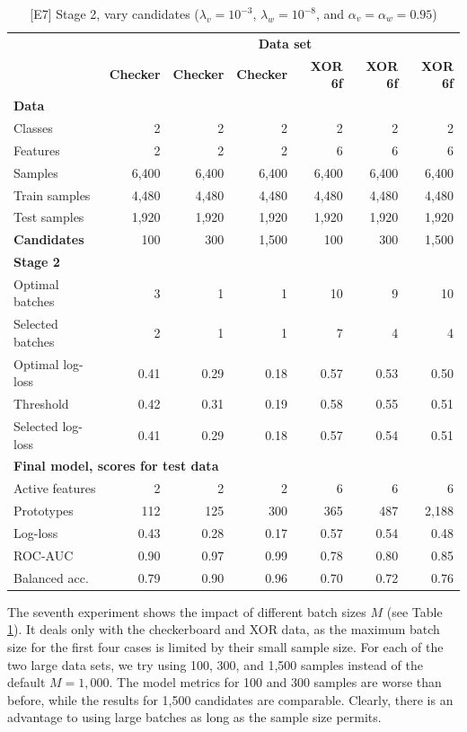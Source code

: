 \begin{table}
\caption{[E7] Stage 2, vary candidates ($\lambda_v=10^{-3}$, $\lambda_w=10^{-8}$, and $\alpha_v=\alpha_w=0.95$)}
\label{tab_e7}
%
\begin{center}
\small
\begin{tabular}{|lrrrrrr|}
\hline
&\multicolumn{6}{c|}{\textbf{\hrulefill\ Data set \hrulefill}}\\
&\textbf{Checker}&\textbf{Checker}&\textbf{Checker}&\textbf{XOR 6f}&\textbf{XOR 6f}&\textbf{XOR 6f}\\
\multicolumn{7}{|l|}{\textbf{Data}}\\
Classes&2&2&2&2&2&2\\
Features&2&2&2&6&6&6\\
Samples&6,400&6,400&6,400&6,400&6,400&6,400\\
Train samples&4,480&4,480&4,480&4,480&4,480&4,480\\
Test samples&1,920&1,920&1,920&1,920&1,920&1,920\\
\textbf{Candidates}&100&300&1,500&100&300&1,500\\
\multicolumn{7}{|l|}{\textbf{Stage 2}}\\
Optimal batches&3&1&1&10&9&10\\
Selected batches&2&1&1&7&4&4\\
Optimal log-loss&0.41&0.29&0.18&0.57&0.53&0.50\\
Threshold&0.42&0.31&0.19&0.58&0.55&0.51\\
Selected log-loss&0.41&0.29&0.18&0.57&0.54&0.51\\
\multicolumn{7}{|l|}{\textbf{Final model, scores for test data}}\\
Active features&2&2&2&6&6&6\\
Prototypes&112&125&300&365&487&2,188\\
Log-loss&0.43&0.28&0.17&0.57&0.54&0.48\\
ROC-AUC&0.90&0.97&0.99&0.78&0.80&0.85\\
Balanced acc.&0.79&0.90&0.96&0.70&0.72&0.76\\
\hline
\end{tabular}
\end{center}
\end{table}
%
The seventh experiment shows the impact of different batch sizes $M$ (see Table \ref{tab_e7}).
It deals only with the checkerboard and XOR data, as the maximum batch size for the first four cases is limited by their small sample size.
For each of the two large data sets, we try using 100, 300, and 1,500 samples instead of the default $M=1,000$.
The model metrics for 100 and 300 samples are worse than before, while the results for 1,500 candidates are comparable.
Clearly, there is an advantage to using large batches as long as the sample size permits.
%
